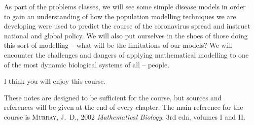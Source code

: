 \documentclass[main.tex]{subfiles}
\begin{document}
As part of the problems classes, we will see some simple disease models in order to gain an understanding of how the population modelling techniques we are developing were used to predict the course of the coronavirus spread and instruct national and global policy. We will also put ourselves in the shoes of those doing this sort of modelling -- what will be the limitations of our models? We will encounter the challenges and dangers of applying mathematical modelling to one of the most dynamic biological systems of all -- people.

I think you will enjoy this course.

%

\vspace{1cm}
\begin{extra-reading}
These notes are designed to be sufficient for the course, but sources and references will be given at the end of every chapter. The main reference for the course is \textsc{Murray}, J.~D., 2002 \emph{Mathematical Biology}, 3rd edn, volumes I and II.
\end{extra-reading}
\end{document}
